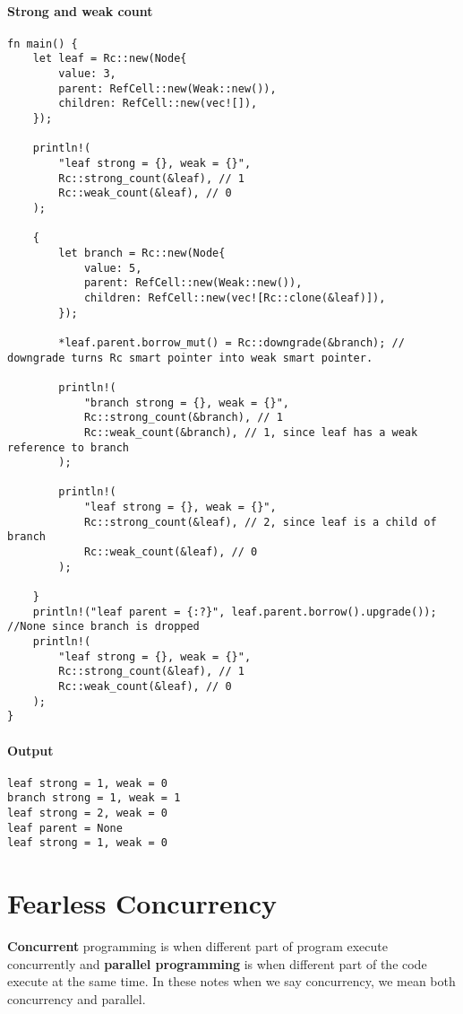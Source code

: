 \paragraph*{Strong and weak count}\begin{lstlisting}
fn main() {
    let leaf = Rc::new(Node{
        value: 3,
        parent: RefCell::new(Weak::new()),
        children: RefCell::new(vec![]),
    });

    println!(
        "leaf strong = {}, weak = {}",
        Rc::strong_count(&leaf), // 1
        Rc::weak_count(&leaf), // 0
    );
    
    {
        let branch = Rc::new(Node{
            value: 5,
            parent: RefCell::new(Weak::new()),
            children: RefCell::new(vec![Rc::clone(&leaf)]),
        });

        *leaf.parent.borrow_mut() = Rc::downgrade(&branch); // downgrade turns Rc smart pointer into weak smart pointer. 

        println!(
            "branch strong = {}, weak = {}",
            Rc::strong_count(&branch), // 1
            Rc::weak_count(&branch), // 1, since leaf has a weak reference to branch
        );

        println!(
            "leaf strong = {}, weak = {}",
            Rc::strong_count(&leaf), // 2, since leaf is a child of branch
            Rc::weak_count(&leaf), // 0
        );

    }
    println!("leaf parent = {:?}", leaf.parent.borrow().upgrade()); //None since branch is dropped 
    println!(
        "leaf strong = {}, weak = {}",
        Rc::strong_count(&leaf), // 1
        Rc::weak_count(&leaf), // 0
    );
}
\end{lstlisting}
\paragraph*{Output}\begin{lstlisting}
leaf strong = 1, weak = 0
branch strong = 1, weak = 1
leaf strong = 2, weak = 0
leaf parent = None
leaf strong = 1, weak = 0
\end{lstlisting}


\section{Fearless Concurrency}
\begin{definition}
    \textbf{Concurrent} programming is when different part of program execute concurrently and \textbf{parallel programming} is when different part of the code execute at the same time. In these notes when we say concurrency, we mean both concurrency and parallel. 
\end{definition}

